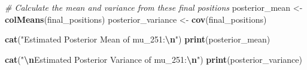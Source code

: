 \documentclass[12pt,halfline,a4paper,]{ouparticle}
\newenvironment{Shaded}{\begin{snugshade}}{\end{snugshade}}
\newcommand{\CommentTok}[1]{\textcolor[rgb]{0.56,0.35,0.01}{\textit{#1}}}
\newcommand{\FunctionTok}[1]{\textcolor[rgb]{0.13,0.29,0.53}{\textbf{#1}}}
\newcommand{\NormalTok}[1]{#1}
\newcommand{\OtherTok}[1]{\textcolor[rgb]{0.56,0.35,0.01}{#1}}
\newcommand{\SpecialCharTok}[1]{\textcolor[rgb]{0.81,0.36,0.00}{\textbf{#1}}}
\newcommand{\StringTok}[1]{\textcolor[rgb]{0.31,0.60,0.02}{#1}}
\begin{document}
\begin{Shaded}
\begin{Highlighting}[]
\CommentTok{\# Calculate the mean and variance from these final positions}
\NormalTok{posterior\_mean }\OtherTok{\textless{}{-}} \FunctionTok{colMeans}\NormalTok{(final\_positions)}
\NormalTok{posterior\_variance }\OtherTok{\textless{}{-}} \FunctionTok{cov}\NormalTok{(final\_positions)}

\FunctionTok{cat}\NormalTok{(}\StringTok{"Estimated Posterior Mean of mu\_251:}\SpecialCharTok{\textbackslash{}n}\StringTok{"}\NormalTok{)}
\FunctionTok{print}\NormalTok{(posterior\_mean)}

\FunctionTok{cat}\NormalTok{(}\StringTok{"}\SpecialCharTok{\textbackslash{}n}\StringTok{Estimated Posterior Variance of mu\_251:}\SpecialCharTok{\textbackslash{}n}\StringTok{"}\NormalTok{)}
\FunctionTok{print}\NormalTok{(posterior\_variance)}
\end{Highlighting}
\end{Shaded}
\end{document}

